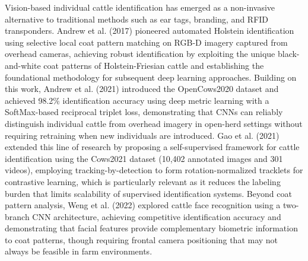 Vision-based individual cattle identification has emerged as a non-invasive alternative to traditional methods such as ear tags, branding, and RFID transponders. Andrew et al. (2017) \cite{andrew2017cattle} pioneered automated Holstein identification using selective local coat pattern matching on RGB-D imagery captured from overhead cameras, achieving robust identification by exploiting the unique black-and-white coat patterns of Holstein-Friesian cattle and establishing the foundational methodology for subsequent deep learning approaches. Building on this work, Andrew et al. (2021) \cite{andrew2021opencows} introduced the OpenCows2020 dataset and achieved 98.2\% identification accuracy using deep metric learning with a SoftMax-based reciprocal triplet loss, demonstrating that CNNs can reliably distinguish individual cattle from overhead imagery in open-herd settings without requiring retraining when new individuals are introduced. Gao et al. (2021) \cite{gao2021cows2021} extended this line of research by proposing a self-supervised framework for cattle identification using the Cows2021 dataset \cite{cows2021} (10,402 annotated images and 301 videos), employing tracking-by-detection to form rotation-normalized tracklets for contrastive learning, which is particularly relevant as it reduces the labeling burden that limits scalability of supervised identification systems. Beyond coat pattern analysis, Weng et al. (2022) \cite{weng2022cattleface} explored cattle face recognition using a two-branch CNN architecture, achieving competitive identification accuracy and demonstrating that facial features provide complementary biometric information to coat patterns, though requiring frontal camera positioning that may not always be feasible in farm environments.

\begin{table}[H]
\centering
\caption{Summary of Cattle Identification Papers}
\label{tab:id_papers}
\end{table}

